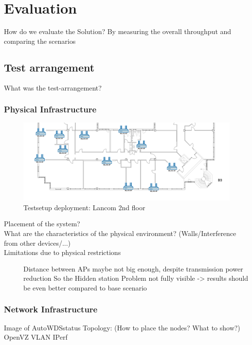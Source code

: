 \chapter{Evaluation}
How do we evaluate the Solution?\newline
  By measuring the overall throughput and comparing the scenarios\newline
\section{Test arrangement}
What was the test-arrangement? \newline
  \subsection{Physical Infrastructure}
    \begin{figure}[t]
      \centering
      \includegraphics[width=1\columnwidth]{figures/Lancom-flur-withaps}
      \caption{Testsetup deployment: Lancom 2nd floor}
      \label{fig:2ndfloor}
    \end{figure}
    \begin{description}
     \item[Placement of the system?]
     \item[What are the characteristics of the physical environment? (Walls/Interference from other devices/...)]
     \item[Limitations due to physical restrictions]
      Distance between APs maybe not big enough, despite transmission power reduction\newline
      So the Hidden station Problem not fully visible -> results should be even better compared to base scenario \newline
    \end{description}
  \subsection{Network Infrastructure}
    Image of AutoWDSstatus Topology: (How to place the nodes? What to show?)
    OpenVZ \newline
    VLAN \newline
    IPerf \newline
